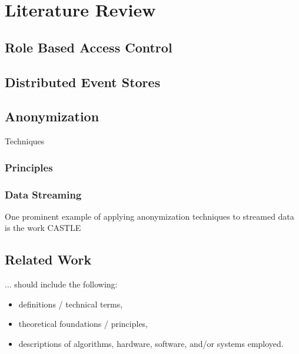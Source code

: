 \chapter{Literature Review\label{cha:chapter2}}

\section{Role Based Access Control}

\section{Distributed Event Stores}

\section{Anonymization\label{sec:anon}}
Techniques 

\subsection{Principles}

\subsection{Data Streaming}
One prominent example of applying anonymization techniques to streamed data is the work CASTLE \cite{Cao2008}

\section{Related Work}

... should include the following:
\begin{itemize}
    \item definitions / technical terms,
    \item theoretical foundations / principles,
    \item descriptions of algorithms, hardware, software, and/or systems employed.
\end{itemize}



